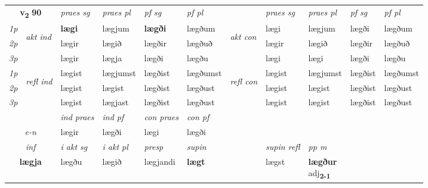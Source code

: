\noindent
\begin{tabular}{lllllllllll} \toprule
\multicolumn{2}{c}{\textbf{v{\textsubscript{2}}} \Large{\textbf{90}}}  &  \textit{praes sg}  & \textit{praes pl}  &\textit{ pf sg} & \textit{pf pl} &  &  \textit{praes sg}  & \textit{praes pl}  & \textit{pf sg} & \textit{pf pl } \\*
	\cmidrule{3-6} \cmidrule{8-11}
 {\textit{1p}} & \multirow{3}{*}{\begin{turn}{90}\textit{akt ind}\end{turn}} & \textbf{lægi} & lægjum & \textbf{lægði} & lægðum & \multirow{3}{*}{\begin{turn}{90}\textit{akt con}\end{turn}} &lægi & lægjum & lægði & lægðum\\*
 {\textit{2p}} &  &  lægir  & lægið & lægðir & lægðuð & & lægir & lægið & lægðir & lægðuð \\*
{\textit{3p}} &  & lægir & lægja & lægði & lægðu & & lægi & lægi& lægði & lægðu \\*
\cmidrule{3-6} \cmidrule{8-11}
 {\textit{1p}} & \multirow{3}{*}{\begin{turn}{90}\textit{refl ind}\end{turn}}  & lægist & lægjumst & lægðist & lægðumst & \multirow{3}{*}{\begin{turn}{90}\textit{refl con}\end{turn}}  &lægist & lægjumst & lægðist & lægðumst \\*
 {\textit{2p}} &  & lægist & lægist & lægðist & lægðust & &lægist & lægist & lægðist & lægðust \\*
 {\textit{3p}}  & & lægist & lægjast & lægðist & lægðust & & lægist & lægist& lægðist & lægðust \\*
\cmidrule{3-6} \cmidrule{8-11}

   & &  \textit{ind praes} & \textit{ind pf} & \textit{con praes} & \textit{con pf} \\*
\multicolumn{2}{c}{ \textit{e-n} } & lægir & lægði & lægi & lægði \\*

\cmidrule{3-9}
   \multicolumn{2}{c}{\textit{inf}}  & \textit{i akt sg} & \textit{i akt pl}   & \textit{presp} & \textit{supin} && \textit{supin refl} & \textit{pp m} \\*
  \multicolumn{2}{c}{\textbf{lægja}} & lægðu  & lægið   & lægjandi &  \textbf{lægt} && lægst & \specialcell{\textbf{lægður} \\ adj\textbf{\textsubscript{2-1}}} \\*
\end{tabular}

